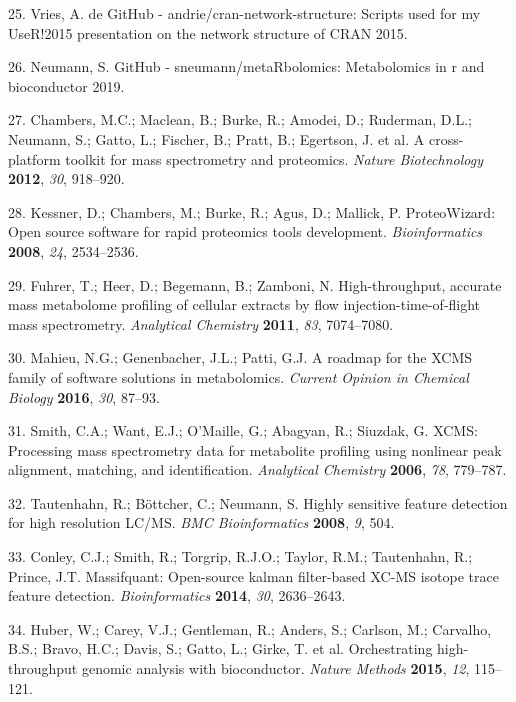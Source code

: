 \documentclass[]{article}
\begin{document}
\leavevmode\hypertarget{ref-devries_website_2015}{}%
25. Vries, A. de GitHub - andrie/cran-network-structure: Scripts used for my UseR!2015 presentation on the network structure of CRAN 2015.

\leavevmode\hypertarget{ref-neumann_website_2019}{}%
26. Neumann, S. GitHub - sneumann/metaRbolomics: Metabolomics in r and bioconductor 2019.

\leavevmode\hypertarget{ref-chambers_2012}{}%
27. Chambers, M.C.; Maclean, B.; Burke, R.; Amodei, D.; Ruderman, D.L.; Neumann, S.; Gatto, L.; Fischer, B.; Pratt, B.; Egertson, J. et al. A cross-platform toolkit for mass spectrometry and proteomics. \emph{Nature Biotechnology} \textbf{2012}, \emph{30}, 918--920.

\leavevmode\hypertarget{ref-kessner_2008}{}%
28. Kessner, D.; Chambers, M.; Burke, R.; Agus, D.; Mallick, P. ProteoWizard: Open source software for rapid proteomics tools development. \emph{Bioinformatics} \textbf{2008}, \emph{24}, 2534--2536.

\leavevmode\hypertarget{ref-fuhrer_2011}{}%
29. Fuhrer, T.; Heer, D.; Begemann, B.; Zamboni, N. High-throughput, accurate mass metabolome profiling of cellular extracts by flow injection-time-of-flight mass spectrometry. \emph{Analytical Chemistry} \textbf{2011}, \emph{83}, 7074--7080.

\leavevmode\hypertarget{ref-mahieu_2016a}{}%
30. Mahieu, N.G.; Genenbacher, J.L.; Patti, G.J. A roadmap for the XCMS family of software solutions in metabolomics. \emph{Current Opinion in Chemical Biology} \textbf{2016}, \emph{30}, 87--93.

\leavevmode\hypertarget{ref-smith_2006}{}%
31. Smith, C.A.; Want, E.J.; O'Maille, G.; Abagyan, R.; Siuzdak, G. XCMS: Processing mass spectrometry data for metabolite profiling using nonlinear peak alignment, matching, and identification. \emph{Analytical Chemistry} \textbf{2006}, \emph{78}, 779--787.

\leavevmode\hypertarget{ref-tautenhahn_2008}{}%
32. Tautenhahn, R.; Böttcher, C.; Neumann, S. Highly sensitive feature detection for high resolution LC/MS. \emph{BMC Bioinformatics} \textbf{2008}, \emph{9}, 504.

\leavevmode\hypertarget{ref-conley_2014}{}%
33. Conley, C.J.; Smith, R.; Torgrip, R.J.O.; Taylor, R.M.; Tautenhahn, R.; Prince, J.T. Massifquant: Open-source kalman filter-based XC-MS isotope trace feature detection. \emph{Bioinformatics} \textbf{2014}, \emph{30}, 2636--2643.

\leavevmode\hypertarget{ref-huber_2015}{}%
34. Huber, W.; Carey, V.J.; Gentleman, R.; Anders, S.; Carlson, M.; Carvalho, B.S.; Bravo, H.C.; Davis, S.; Gatto, L.; Girke, T. et al. Orchestrating high-throughput genomic analysis with bioconductor. \emph{Nature Methods} \textbf{2015}, \emph{12}, 115--121.
\end{document}
